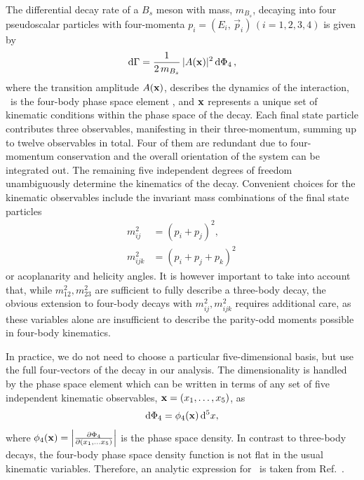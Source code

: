 The differential decay rate of a $B_s$ meson 
with mass, $m_{B_s}$,
decaying into four pseudoscalar particles with four-momenta $p_{i}= (E_{i},\, \vec p_{i}) \, (i=1,2,3,4)$
is given by
\begin{equation}
	\text{d}\Gamma = \frac{1}{2 \, m_{B_s}} \,  \vert A(\mathbf{x}) \vert^{2} \, \mathrm{d}\Phi_4   \, ,
	\label{eq:decayRate}
\end{equation}
where the transition amplitude $A(\mathbf{x})$, describes the dynamics of the interaction, 
\dphs\ is the four-body phase space element \cite{Peskin}, and 
$\mathbf{x}$ 
represents a unique set of kinematic conditions within the phase space of the decay.
Each final state particle contributes three observables,
manifesting in their three-momentum,
summing up to twelve observables in total.
Four of them are redundant 
due to four-momentum conservation and
the overall orientation of the system can be integrated out.
The remaining  five independent degrees of freedom unambiguously determine the kinematics of the decay.
Convenient choices for the kinematic observables
include the invariant mass combinations of the final state particles
\begin{align}
	\nonumber
	m^{2}_{ij} &= (p_{i}+p_{j})^{2} , \\
	m^{2}_{ijk} &= (p_{i}+p_{j}+p_{k})^{2} \, 
\end{align}
or acoplanarity and helicity angles. %
It is however important
to take into account that, while $m^2_{12}, m^2_{23}$ are sufficient
to fully describe a three-body decay, the obvious extension to
four-body decays with $m^{2}_{ij}, m^{2}_{ijk}$ requires additional
care, as these variables alone are insufficient to describe the parity-odd
moments possible in four-body kinematics.

In practice, we do not need to choose a particular five-dimensional
basis, but use the full four-vectors of the decay in our
analysis. 
The dimensionality is handled by the phase space element which can be written in terms of any set of five independent kinematic observables, $\mathbf{x} = (x_1, \ldots, x_5)$, as
\begin{equation}
	\mathrm{d}\Phi_4 = \phi_4(\mathbf{x}) \, \mathrm{d}^5x ,
\end{equation}
where $\phi_{4}(\mathbf{x} ) = \left\vert  \frac{\partial \Phi_4}{\partial(x_1, \ldots x_5)} \right\vert$ is the phase space density.
In contrast to three-body decays, the four-body phase space density
function is not flat in the usual kinematic variables.  
Therefore, an analytic expression for \phsd\ is
taken from Ref.~\cite{kinematics}.

